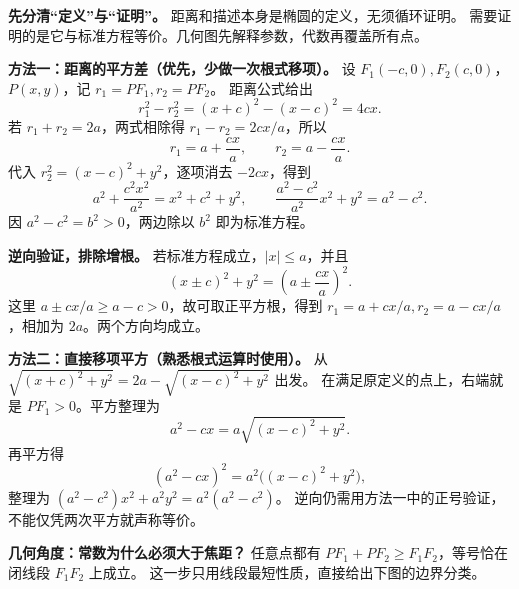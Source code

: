 \begin{proofbox}
\textbf{先分清“定义”与“证明”。} 距离和描述本身是椭圆的定义，无须循环证明。
需要证明的是它与标准方程等价。几何图先解释参数，代数再覆盖所有点。

\textbf{方法一：距离的平方差（优先，少做一次根式移项）。}
设 $F_1(-c,0),F_2(c,0)$，$P(x,y)$，记 $r_1=PF_1,r_2=PF_2$。
距离公式给出
\[
r_1^2-r_2^2=(x+c)^2-(x-c)^2=4cx.
\]
若 $r_1+r_2=2a$，两式相除得 $r_1-r_2=2cx/a$，所以
\[
r_1=a+\frac{cx}{a},\qquad r_2=a-\frac{cx}{a}.
\]
代入 $r_2^2=(x-c)^2+y^2$，逐项消去 $-2cx$，得到
\[
a^2+\frac{c^2x^2}{a^2}=x^2+c^2+y^2,
\qquad
\frac{a^2-c^2}{a^2}x^2+y^2=a^2-c^2.
\]
因 $a^2-c^2=b^2>0$，两边除以 $b^2$ 即为标准方程。

\textbf{逆向验证，排除增根。} 若标准方程成立，$|x|\le a$，并且
\[
(x\pm c)^2+y^2=\left(a\pm\frac{cx}{a}\right)^2.
\]
这里 $a\pm cx/a\ge a-c>0$，故可取正平方根，得到
$r_1=a+cx/a,r_2=a-cx/a$，相加为 $2a$。两个方向均成立。
\end{proofbox}
\clearpage
\begin{proofbox}
\textbf{方法二：直接移项平方（熟悉根式运算时使用）。}
从 $\sqrt{(x+c)^2+y^2}=2a-\sqrt{(x-c)^2+y^2}$ 出发。
在满足原定义的点上，右端就是 $PF_1>0$。平方整理为
\[
a^2-cx=a\sqrt{(x-c)^2+y^2}.
\]
再平方得
\[
(a^2-cx)^2=a^2\bigl((x-c)^2+y^2\bigr),
\]
整理为 $(a^2-c^2)x^2+a^2y^2=a^2(a^2-c^2)$。
逆向仍需用方法一中的正号验证，不能仅凭两次平方就声称等价。

\textbf{几何角度：常数为什么必须大于焦距？}
任意点都有 $PF_1+PF_2\ge F_1F_2$，等号恰在闭线段 $F_1F_2$ 上成立。
这一步只用线段最短性质，直接给出下图的边界分类。
\end{proofbox}
